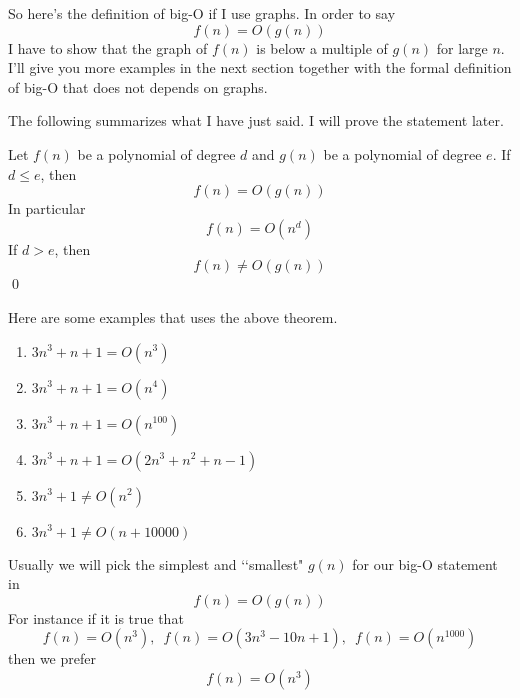 So here's the definition of big-O if I use graphs.
In order to say
\[
f(n) = O(g(n))
\]
I have to show that the graph of $f(n)$ is below a multiple of $g(n)$
for large $n$.
I'll give you more examples in the next section together with
the formal definition of big-O that does not depends on graphs.

The following summarizes what I have just said.
I will prove the statement later.

\begin{thm}
Let $f(n)$ be a polynomial of degree $d$ and $g(n)$ be a polynomial
of degree $e$.
If $d \leq e$, then
\[
f(n) = O(g(n))
\]
In particular
\[
f(n) = O(n^d)
\]
If $d > e$, then
\[
f(n) \neq O(g(n))
\]
\qed
\end{thm}

\begin{eg}
  Here are some examples that uses the above theorem.
  \begin{enumerate}[nosep,label=(\alph*)]
  \item $3n^3 + n + 1 = O(n^3)$
  \item $3n^3 + n + 1 = O(n^4)$  
  \item $3n^3 + n + 1 = O(n^{100})$
  \item $3n^3 + n + 1 = O(2n^3 + n^2 + n - 1)$
  \item $3n^3 + 1 \neq O(n^2)$
  \item $3n^3 + 1 \neq O(n + 10000)$
  \end{enumerate}
\end{eg}

Usually we will pick the simplest and \lq\lq smallest" $g(n)$
for our big-O statement in
\[
f(n) = O(g(n))
\]
For instance if it is true that
\[
f(n) = O(n^3), \,\,\,
f(n) = O(3n^3 - 10n + 1), \,\,\,
f(n) = O(n^{1000})
\]
then we prefer
\[
f(n) = O(n^3)
\]

\newpage
